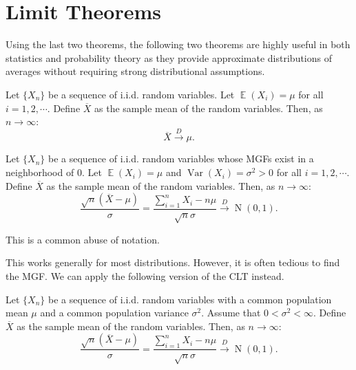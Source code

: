 \documentclass{huhtakm-template-book-v2}
\DeclareMathOperator{\E}{\mathbb{E}}
\DeclareMathOperator{\Var}{Var}
\DeclareMathOperator{\N}{N}
\begin{document}
\section{Limit Theorems}
    Using the last two theorems, the following two theorems are highly useful in both statistics and probability theory as they provide approximate distributions of averages without requiring strong distributional assumptions.
    \begin{thm}
        Let $\{X_{n}\}$ be a sequence of i.i.d. random variables. Let $\E(X_{i}) = \mu$ for all $i = 1, 2, \cdots$. Define $\overline{X}$ as the sample mean of the random variables. Then, as $n \to \infty$:
        \begin{equation*}
            \overline{X} \xrightarrow{D} \mu.
        \end{equation*}
    \end{thm}
    \begin{thm}
        Let $\{X_{n}\}$ be a sequence of i.i.d. random variables whose MGFs exist in a neighborhood of $0$. Let $\E(X_{i}) = \mu$ and $\Var(X_{i}) = \sigma^{2} > 0$ for all $i = 1, 2, \cdots$. Define $\overline{X}$ as the sample mean of the random variables. Then, as $n \to \infty$:
        \begin{equation*}
            \frac{\sqrt{n}(\overline{X} - \mu)}{\sigma} = \frac{\sum_{i=1}^{n} X_{i} - n\mu}{\sqrt{n}\sigma} \xrightarrow{D} \N(0, 1).
        \end{equation*}
    \end{thm}
    \begin{rem}
        This is a common abuse of notation.
    \end{rem}
    This works generally for most distributions. However, it is often tedious to find the MGF. We can apply the following version of the CLT instead.
    \begin{thm}
        Let $\{X_{n}\}$ be a sequence of i.i.d. random variables with a common population mean $\mu$ and a common population variance $\sigma^{2}$. Assume that $0 < \sigma^{2} < \infty$. Define $\overline{X}$ as the sample mean of the random variables. Then, as $n \to \infty$:
        \begin{equation*}
            \frac{\sqrt{n}(\overline{X} - \mu)}{\sigma} = \frac{\sum_{i=1}^{n} X_{i} - n\mu}{\sqrt{n}\sigma} \xrightarrow{D} \N(0, 1).
        \end{equation*}
    \end{thm}
\end{document}
